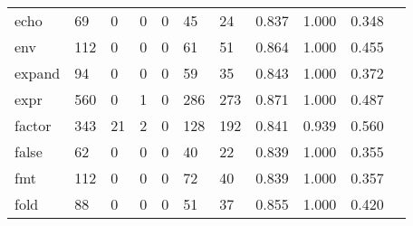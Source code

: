 \begin{longtable}{lp{1.10cm}p{1.10cm}p{1.10cm}p{1.10cm}p{1.10cm}p{1.10cm}p{1.10cm}p{1.10cm}p{1.10cm}p{1.10cm}}
echo      &                     69 &                                  0 &                                 0 &                                0 &                                45 &                              24 &                          0.837 &                                 1.000 &                               0.348 \\
env       &                    112 &                                  0 &                                 0 &                                0 &                                61 &                              51 &                          0.864 &                                 1.000 &                               0.455 \\
expand    &                     94 &                                  0 &                                 0 &                                0 &                                59 &                              35 &                          0.843 &                                 1.000 &                               0.372 \\
expr      &                    560 &                                  0 &                                 1 &                                0 &                               286 &                             273 &                          0.871 &                                 1.000 &                               0.487 \\
factor    &                    343 &                                 21 &                                 2 &                                0 &                               128 &                             192 &                          0.841 &                                 0.939 &                               0.560 \\
false     &                     62 &                                  0 &                                 0 &                                0 &                                40 &                              22 &                          0.839 &                                 1.000 &                               0.355 \\
fmt       &                    112 &                                  0 &                                 0 &                                0 &                                72 &                              40 &                          0.839 &                                 1.000 &                               0.357 \\
fold      &                     88 &                                  0 &                                 0 &                                0 &                                51 &                              37 &                          0.855 &                                 1.000 &                               0.420 \\

\end{longtable}
